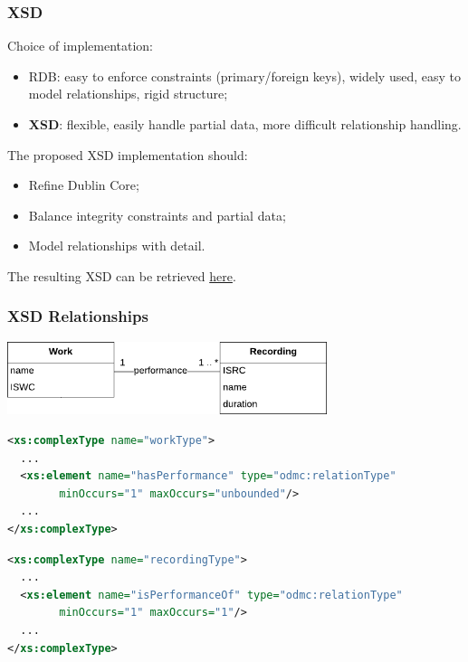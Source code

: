 \documentclass{beamer}
\newcommand\rb[1]{\textcolor{ThemeRed}{\textbf{#1}}}
\begin{document}
  \begin{frame}
    \frametitle{XSD}

    Choice of implementation:

    \vspace{0.5em}

    \begin{itemize}
      \item RDB: easy to enforce constraints (primary/foreign keys), widely used, easy to model relationships, rigid structure;
      \item \rb{XSD}: flexible, easily handle partial data, more difficult relationship handling.
    \end{itemize}

    \vspace{1.5em}

    The proposed XSD implementation should:

    \vspace{0.5em}

    \begin{itemize}
      \item Refine Dublin Core;
      \item Balance integrity constraints and partial data;
      \item Model relationships with detail. 
    \end{itemize}

    \vspace{1.5em}

    The resulting XSD can be retrieved \href{https://github.com/pindri/ODMC_exam/blob/master/odmc.xsd}{here}.
  \end{frame}
  
  
  
  \begin{frame}[fragile]
    \frametitle{XSD Relationships}
    
    \begin{center}
      \includegraphics[width=0.7\textwidth]{img/WorkRecording.pdf}
    \end{center}
    
    \lstset{basicstyle=\scriptsize\ttfamily}
\begin{lstlisting}[language=XML]
<xs:complexType name="workType">
  ...
  <xs:element name="hasPerformance" type="odmc:relationType"
        minOccurs="1" maxOccurs="unbounded"/>
  ...
</xs:complexType>
\end{lstlisting}

    \lstset{basicstyle=\scriptsize\ttfamily}
\begin{lstlisting}[language=XML]
<xs:complexType name="recordingType">
  ...
  <xs:element name="isPerformanceOf" type="odmc:relationType"
        minOccurs="1" maxOccurs="1"/>
  ...
</xs:complexType>
\end{lstlisting}

  \end{frame}
\end{document}
